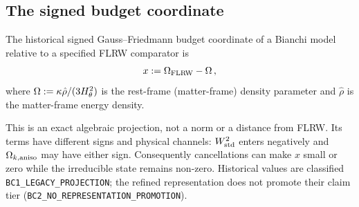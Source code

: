\begin{center}
\end{center}


\subsection{The signed budget coordinate}\label{sec:defect-x}

\begin{definition}\label{def:defect}
The historical signed Gauss--Friedmann budget coordinate of a Bianchi
model relative to a specified FLRW comparator is
\begin{equation}\label{eq:defect-def}
x := \Omega_{\mathrm{FLRW}} - \Omega\,,
\end{equation}
where $\Omega := \kappa\hat{\rho}/(3H_\theta^2)$ is the
rest-frame (matter-frame) density parameter and $\hat{\rho}$
is the matter-frame energy density.
\end{definition}

This is an exact algebraic projection, not a norm or a distance from
FLRW.  Its terms have different signs and physical channels:
$W^2_{\mathrm{std}}$ enters negatively and $\Omega_{k,\mathrm{aniso}}$ may have either sign.
Consequently cancellations can make $x$ small or zero while the
irreducible state remains non-zero.  Historical values are classified
\texttt{BC1\_LEGACY\_PROJECTION}; the refined representation does not
promote their claim tier
(\texttt{BC2\_NO\_REPRESENTATION\_PROMOTION}).


